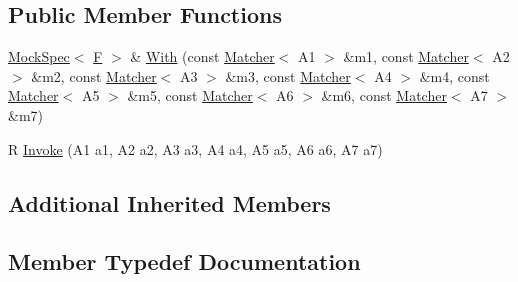 \subsection*{Public Member Functions}
\begin{DoxyCompactItemize}
\item 
\hyperlink{classtesting_1_1internal_1_1_mock_spec}{Mock\+Spec}$<$ \hyperlink{classtesting_1_1internal_1_1_function_mocker_3_01_r_07_a1_00_01_a2_00_01_a3_00_01_a4_00_01_a5_00_01_a6_00_01_a7_08_4_a2ea0e33d9cc0d1f57d58b4aee98c117c}{F} $>$ \& \hyperlink{classtesting_1_1internal_1_1_function_mocker_3_01_r_07_a1_00_01_a2_00_01_a3_00_01_a4_00_01_a5_00_01_a6_00_01_a7_08_4_abaa600e7ae355a1579d1c02a4ea726fb}{With} (const \hyperlink{classtesting_1_1_matcher}{Matcher}$<$ A1 $>$ \&m1, const \hyperlink{classtesting_1_1_matcher}{Matcher}$<$ A2 $>$ \&m2, const \hyperlink{classtesting_1_1_matcher}{Matcher}$<$ A3 $>$ \&m3, const \hyperlink{classtesting_1_1_matcher}{Matcher}$<$ A4 $>$ \&m4, const \hyperlink{classtesting_1_1_matcher}{Matcher}$<$ A5 $>$ \&m5, const \hyperlink{classtesting_1_1_matcher}{Matcher}$<$ A6 $>$ \&m6, const \hyperlink{classtesting_1_1_matcher}{Matcher}$<$ A7 $>$ \&m7)
\item 
R \hyperlink{classtesting_1_1internal_1_1_function_mocker_3_01_r_07_a1_00_01_a2_00_01_a3_00_01_a4_00_01_a5_00_01_a6_00_01_a7_08_4_a9088342f6d93448dba290e565c006979}{Invoke} (A1 a1, A2 a2, A3 a3, A4 a4, A5 a5, A6 a6, A7 a7)
\end{DoxyCompactItemize}
\subsection*{Additional Inherited Members}


\subsection{Member Typedef Documentation}
